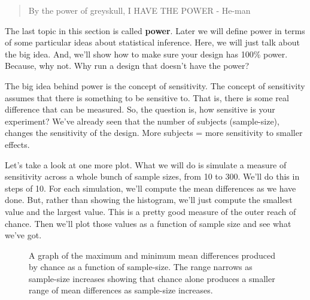 \documentclass[
  letterpaper,
  DIV=11,
  numbers=noendperiod]{scrreprt}
\begin{document}
\begin{quote}
By the power of greyskull, I HAVE THE POWER - He-man
\end{quote}

The last topic in this section is called \textbf{power}. Later we will
define power in terms of some particular ideas about statistical
inference. Here, we will just talk about the big idea. And, we'll show
how to make sure your design has 100\% power. Because, why not. Why run
a design that doesn't have the power?

The big idea behind power is the concept of sensitivity. The concept of
sensitivity assumes that there is something to be sensitive to. That is,
there is some real difference that can be measured. So, the question is,
how sensitive is your experiment? We've already seen that the number of
subjects (sample-size), changes the sensitivity of the design. More
subjects = more sensitivity to smaller effects.

Let's take a look at one more plot. What we will do is simulate a
measure of sensitivity across a whole bunch of sample sizes, from 10 to
300. We'll do this in steps of 10. For each simulation, we'll compute
the mean differences as we have done. But, rather than showing the
histogram, we'll just compute the smallest value and the largest value.
This is a pretty good measure of the outer reach of chance. Then we'll
plot those values as a function of sample size and see what we've got.

\begin{figure}


\caption{\label{fig-5crumpminmax}A graph of the maximum and minimum mean
differences produced by chance as a function of sample-size. The range
narrows as sample-size increases showing that chance alone produces a
smaller range of mean differences as sample-size increases.}

\end{figure}%
\end{document}
